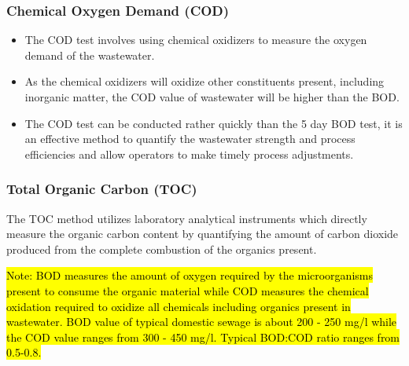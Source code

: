 \begin{itemize}
			    \subsubsection{Chemical Oxygen Demand (COD)}
			      	\begin{itemize}
			      		\item The COD test involves using chemical oxidizers to measure the oxygen demand of the wastewater.
			      		\item As the chemical oxidizers will oxidize other constituents present, including inorganic matter, the COD value of wastewater will be higher than the BOD.  
			      		\item The COD test can be conducted rather quickly than the 5 day BOD test, it is an effective method to quantify the wastewater strength and process efficiencies and allow operators to make timely process adjustments.
			      	\end{itemize}

			    \subsubsection{Total Organic Carbon (TOC)}
			      	The TOC method utilizes laboratory analytical instruments which directly measure the organic carbon content by quantifying the amount of carbon dioxide produced from the complete combustion of the organics present.
		\end{itemize}
		
		
		
			\hl{Note: BOD measures the amount of oxygen required by the microorganisms present to consume the organic material while COD measures the chemical oxidation required to oxidize all chemicals including organics present in wastewater.  BOD value of typical domestic sewage is about 200 - 250 mg/l while the COD value ranges from 300 - 450 mg/l.  Typical BOD:COD ratio ranges from 0.5-0.8.}\\


